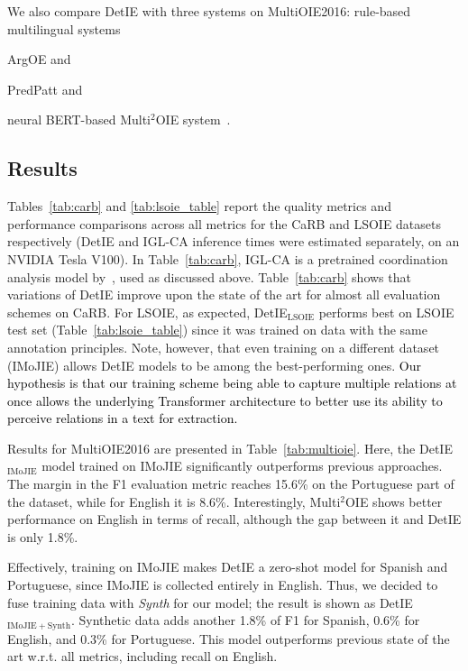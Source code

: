 \documentclass[letterpaper]{article} \usepackage{aaai22}  \usepackage{times}  \usepackage{helvet}  \usepackage{courier}  \usepackage[hyphens]{url}  \usepackage{graphicx} \usepackage{placeins}
\newcommand{\added}[1]{\textcolor{black}{#1}}
\begin{document}
We also compare DetIE with three systems on MultiOIE2016: rule-based multilingual systems
\begin{inparaenum}[(1)]
\item ArgOE \cite{gamallo2015multilingual} and 
\item PredPatt \cite{white2016universal} and
\item neural BERT-based Multi$^2$OIE system~\cite{ro2020multi}.
\end{inparaenum}

\subsection{Results}

Tables~\ref{tab:carb} and \ref{tab:lsoie_table} report the quality metrics and performance comparisons across all metrics for the CaRB and LSOIE datasets respectively (DetIE and IGL-CA inference times were estimated separately, on an NVIDIA Tesla V100).
In Table~\ref{tab:carb}, IGL-CA is a pretrained coordination analysis model by~\citet{kolluru2020openie6}, used as discussed above. Table~\ref{tab:carb} shows that variations of DetIE improve upon the state of the art for almost all evaluation schemes on CaRB. For LSOIE,
as expected, DetIE$_{\mathrm{LSOIE}}$ performs best on LSOIE test set (Table~\ref{tab:lsoie_table}) since it was trained on data with the same annotation principles. Note, however, that even training on a different dataset (IMoJIE) allows DetIE models to be among the best-performing ones. \added{Our hypothesis is that our training scheme being able to capture multiple relations at once allows the underlying Transformer architecture to better use its ability to perceive relations in a text for extraction.}

Results for MultiOIE2016 are presented in Table~\ref{tab:multioie}. Here, the DetIE$_\mathrm{IMoJIE}$ model trained on IMoJIE significantly outperforms previous approaches. The margin in the F1 evaluation metric reaches 15.6\% on the Portuguese part of the dataset, while for English it is 8.6\%. Interestingly, Multi$^2$OIE shows better performance on English in terms of recall, although the gap between it and DetIE is only 1.8\%.

Effectively, training on IMoJIE makes DetIE a zero-shot model for Spanish and Portuguese, since IMoJIE is collected entirely in English. Thus, we decided to fuse training data with \emph{Synth} for our model; the result is shown as DetIE$_\mathrm{IMoJIE+Synth}$. Synthetic data adds another 1.8\% of F1 for Spanish, 0.6\% for English, and 0.3\% for Portuguese. This model outperforms previous state of the art w.r.t. all metrics, including recall on English.
\end{document}
